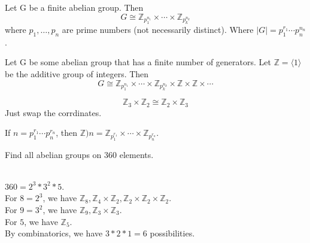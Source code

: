 
\begin{theorem}
    Let G be a finite abelian group. 
    Then \[G \cong \mathbb{Z}_{p_1^{n_1}} \times \cdots \times \mathbb{Z}_{p_k^{n_k}}\]
    where $p_1, \ldots, p_n$ are prime numbers (not necessarily distinct). Where $|G| = p_1^{r_1} \cdots p_n^{n_n}$.
\end{theorem}

\begin{theorem}
    Let G be some abelian group that has a finite number of generators.
    Let $\mathbb{Z} = \langle 1 \rangle$ be the additive group of integers.
    Then \[G \cong \mathbb{Z}_{p_1^{n_1}} \times \cdots \times \mathbb{Z}_{p_k^{n_k}} \times \mathbb{Z} \times \mathbb{Z} \times \cdots\]
\end{theorem}

\begin{remark}
    \[\mathbb{Z}_3 \times \mathbb{Z}_2 \cong \mathbb{Z}_2 \times \mathbb{Z}_3\]
    Just swap the corrdinates.
\end{remark}

\begin{corollary}
    If $n = p_1^{r_1} \cdots p_n^{r_n}$, then $\mathbb{Z})n = \mathbb{Z}_{p_1^{r_1}} \times \cdots \times \mathbb{Z}_{p_n^{r_n}}$.
\end{corollary}

\begin{exercise}
    Find all abelian groups on 360 elements.
\end{exercise}
\begin{answer}
    \vphantom{}\\
    $360 = 2^3 * 3^2 * 5$.\\

    \noindent For $8 = 2^3$, we have $\mathbb{Z}_8, \mathbb{Z}_4 \times \mathbb{Z}_2, \mathbb{Z}_2 \times \mathbb{Z}_2 \times \mathbb{Z}_2$.\\
    For $9 = 3^2$, we have $\mathbb{Z}_9, \mathbb{Z}_3 \times \mathbb{Z}_3$.\\
    For $5$, we have $\mathbb{Z}_5$.\\

    \noindent By combinatorics, we have $3 * 2 * 1 = 6$ possibilities.
\end{answer}

